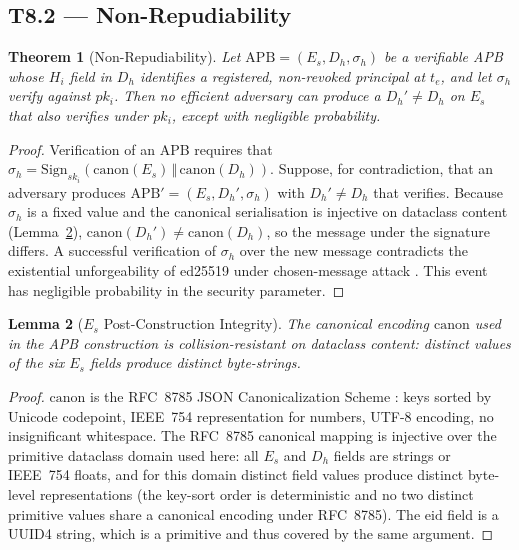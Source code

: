\documentclass[11pt]{article}
\newtheorem{theorem}{Theorem}[section]
\newtheorem{lemma}[theorem]{Lemma}
\newcommand{\Es}{E_s}
\newcommand{\Dh}{D_h}
\newcommand{\sigh}{\sigma_h}
\newcommand{\Hi}{H_i}
\newcommand{\ski}{sk_i}
\newcommand{\pki}{pk_i}
\newcommand{\APB}{\mathrm{APB}}
\begin{document}
\subsection{T8.2 --- Non-Repudiability}
\label{sec:t82}

\begin{theorem}[Non-Repudiability]
\label{thm:nonrep}
Let $\APB = (\Es, \Dh, \sigh)$ be a verifiable APB whose $\Hi$ field
in $\Dh$ identifies a registered, non-revoked principal at $t_e$, and
let $\sigh$ verify against $\pki$. Then no efficient adversary can
produce a $\Dh' \neq \Dh$ on $\Es$ that also verifies under $\pki$,
except with negligible probability.
\end{theorem}

\begin{proof}
Verification of an APB requires that
$\sigh = \mathrm{Sign}_{\ski}(\mathrm{canon}(\Es) \,\Vert\,
\mathrm{canon}(\Dh))$. Suppose, for contradiction, that an adversary
produces $\APB' = (\Es, \Dh', \sigh)$ with $\Dh' \neq \Dh$ that
verifies. Because $\sigh$ is a fixed value and the canonical
serialisation is injective on dataclass content (Lemma~\ref{lem:integrity}),
$\mathrm{canon}(\Dh') \neq \mathrm{canon}(\Dh)$, so the message under
the signature differs. A successful verification of $\sigh$ over the
new message contradicts the existential unforgeability of ed25519
under chosen-message attack
\citep{bernstein2012highspeed,boneh2014foundations}. This event has
negligible probability in the security parameter.
\end{proof}

\begin{lemma}[$\Es$ Post-Construction Integrity]
\label{lem:integrity}
The canonical encoding $\mathrm{canon}$ used in the APB construction
is collision-resistant on dataclass content: distinct values of the
six $\Es$ fields produce distinct byte-strings.
\end{lemma}

\begin{proof}
$\mathrm{canon}$ is the RFC~8785 JSON Canonicalization Scheme
\citep{rfc8785}: keys sorted by Unicode codepoint, IEEE~754
representation for numbers, UTF-8 encoding, no insignificant whitespace.
The RFC~8785 canonical mapping is injective over the primitive
dataclass domain used here: all $\Es$ and $\Dh$ fields are strings
or IEEE~754 floats, and for this domain distinct field values produce
distinct byte-level representations (the key-sort order is
deterministic and no two distinct primitive values share a
canonical encoding under RFC~8785).
The $\mathrm{eid}$ field is a UUID4 string, which is a primitive and
thus covered by the same argument.
\end{proof}
\end{document}
